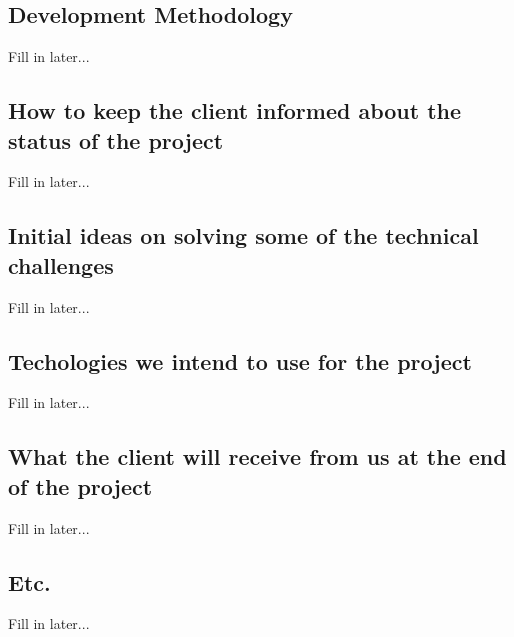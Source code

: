 \documentclass[12pt, oneside]{article}
\begin{document}
	\subsection{Development Methodology}
		Fill in later...
	\subsection{How to keep the client informed about the status of the project}
		Fill in later...
	\subsection{Initial ideas on solving some of the technical challenges}
		Fill in later...
	\subsection{Techologies we intend to use for the project}
		Fill in later...
	\subsection{What the client will receive from us at the end of the project}
		Fill in later...
	\subsection{Etc.}
		Fill in later...
\end{document}
